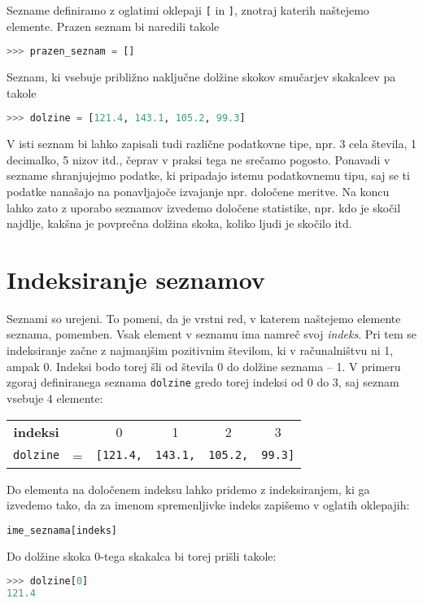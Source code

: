 Sezname definiramo z oglatimi oklepaji \texttt{[} in \texttt{]}, znotraj katerih naštejemo elemente. Prazen seznam bi naredili takole
\begin{lstlisting}[language=Python]
>>> prazen_seznam = []
\end{lstlisting}
Seznam, ki vsebuje približno naključne dolžine skokov smučarjev skakalcev pa takole
\begin{lstlisting}[language=Python]
>>> dolzine = [121.4, 143.1, 105.2, 99.3]
\end{lstlisting}
V isti seznam bi lahko zapisali tudi različne podatkovne tipe, npr. 3 cela števila, 1 decimalko, 5 nizov itd., čeprav v praksi tega ne srečamo pogosto. Ponavadi v sezname shranjujejmo podatke, ki pripadajo istemu podatkovnemu tipu, saj se ti podatke nanašajo na ponavljajoče izvajanje npr. določene meritve. Na koncu lahko zato z uporabo seznamov izvedemo določene statistike, npr. kdo je skočil najdlje, kakšna je povprečna dolžina skoka, koliko ljudi je skočilo itd.

\section{Indeksiranje seznamov}
Seznami so urejeni. To pomeni, da je vrstni red, v katerem naštejemo elemente seznama, pomemben. Vsak element v seznamu ima namreč svoj \emph{indeks}. Pri tem se indeksiranje začne z najmanjšim pozitivnim številom, ki v računalništvu ni 1, ampak 0. Indeksi bodo torej šli od števila 0 do dolžine seznama -- 1. V primeru zgoraj definiranega seznama \texttt{dolzine} gredo torej indeksi od 0 do 3, saj seznam vsebuje 4 elemente:

\begin{tabular}{cccccc}
\textbf{indeksi} & & 0 & 1 & 2 & 3\\
\texttt{dolzine} & = & \texttt{[121.4,}& \texttt{143.1,} & \texttt{105.2,} & \texttt{99.3]}
\end{tabular}

Do elementa na določenem indeksu lahko pridemo z indeksiranjem, ki ga izvedemo tako, da za imenom spremenljivke indeks zapišemo v oglatih oklepajih:
\begin{lstlisting}[language=Python]
ime_seznama[indeks]
\end{lstlisting}
Do dolžine skoka 0-tega skakalca bi torej prišli takole:
\begin{lstlisting}[language=Python]
>>> dolzine[0]
121.4
\end{lstlisting}

